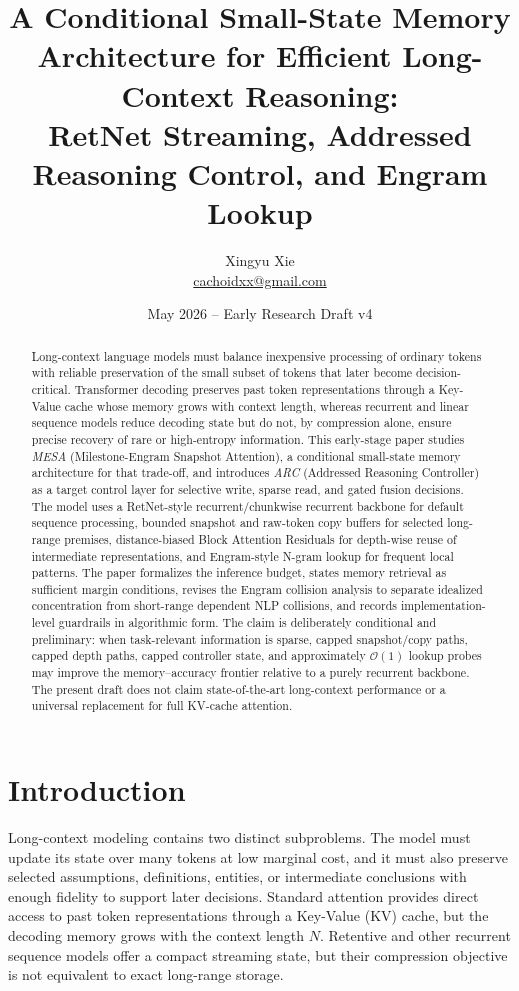 \documentclass[11pt]{article}
\title{A Conditional Small-State Memory Architecture for Efficient Long-Context Reasoning:\\[0.25em]
\Large RetNet Streaming, Addressed Reasoning Control, and Engram Lookup}
\author{Xingyu Xie \\ \href{mailto:cachoidxx@gmail.com}{cachoidxx@gmail.com}}
\date{May 2026 -- Early Research Draft v4}
\newcommand{\Oh}{\mathcal{O}}
\begin{document}
\maketitle

\begin{abstract}
Long-context language models must balance inexpensive processing of ordinary tokens with reliable preservation of the small subset of tokens that later become decision-critical. Transformer decoding preserves past token representations through a Key-Value cache whose memory grows with context length, whereas recurrent and linear sequence models reduce decoding state but do not, by compression alone, ensure precise recovery of rare or high-entropy information. This early-stage paper studies \emph{MESA} (Milestone-Engram Snapshot Attention), a conditional small-state memory architecture for that trade-off, and introduces \emph{ARC} (Addressed Reasoning Controller) as a target control layer for selective write, sparse read, and gated fusion decisions. The model uses a RetNet-style recurrent/chunkwise recurrent backbone for default sequence processing, bounded snapshot and raw-token copy buffers for selected long-range premises, distance-biased Block Attention Residuals for depth-wise reuse of intermediate representations, and Engram-style N-gram lookup for frequent local patterns. The paper formalizes the inference budget, states memory retrieval as sufficient margin conditions, revises the Engram collision analysis to separate idealized concentration from short-range dependent NLP collisions, and records implementation-level guardrails in algorithmic form. The claim is deliberately conditional and preliminary: when task-relevant information is sparse, capped snapshot/copy paths, capped depth paths, capped controller state, and approximately $\Oh(1)$ lookup probes may improve the memory--accuracy frontier relative to a purely recurrent backbone. The present draft does not claim state-of-the-art long-context performance or a universal replacement for full KV-cache attention.
\end{abstract}

\tableofcontents
\newpage

\section{Introduction}

Long-context modeling contains two distinct subproblems. The model must update its state over many tokens at low marginal cost, and it must also preserve selected assumptions, definitions, entities, or intermediate conclusions with enough fidelity to support later decisions. Standard attention provides direct access to past token representations through a Key-Value (KV) cache, but the decoding memory grows with the context length $N$. Retentive and other recurrent sequence models offer a compact streaming state, but their compression objective is not equivalent to exact long-range storage.
\end{document}
